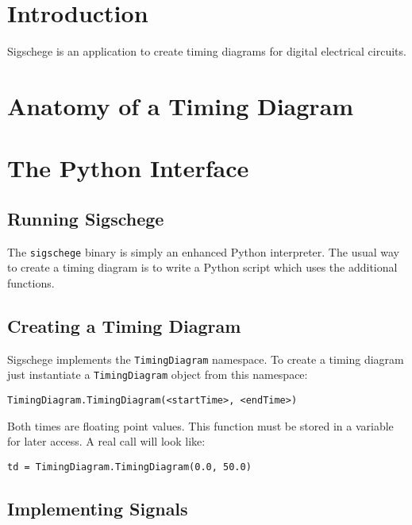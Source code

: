 \documentclass[11pt]{article}
\begin{document}
\section{Introduction}
\label{sec:intro}

Sigschege is an application to create timing diagrams for digital electrical circuits.



\section{Anatomy of a Timing Diagram}
\label{sec:anatomy}



\section{The Python Interface}
\label{sec:python}

\subsection{Running Sigschege}

The \texttt{sigschege} binary is simply an enhanced Python interpreter. The
usual way to create a timing diagram is to write a Python script which uses the
additional functions.

\subsection{Creating a Timing Diagram}

Sigschege implements the \texttt{TimingDiagram} namespace. To create a timing
diagram just instantiate a \texttt{TimingDiagram} object from this namespace:


\begin{center}
  \texttt{TimingDiagram.TimingDiagram(<startTime>, <endTime>)}
\end{center}

Both times are floating point values.
This function must be stored in a variable for later access. A real call will
look like:

\begin{center}
  \texttt{td = TimingDiagram.TimingDiagram(0.0, 50.0)}
\end{center}

\subsection{Implementing Signals}
\label{sec:sig}
\end{document}

